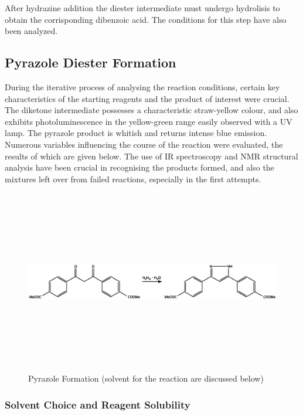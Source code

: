 \documentclass[../Master.tex]{subfiles}
\begin{document}
After hydrazine addition the diester intermediate must undergo hydrolisis to obtain the corrisponding dibenzoic acid. The conditions for this step have also been analyzed.

\subsection{Pyrazole Diester Formation}\label{sec:pyrazole-diester}

During the iterative process of analysing the reaction conditions, certain key characteristics of the starting reagents and the product of interest were crucial. The diketone intermediate possesses a characteristic straw-yellow colour, and also exhibits photoluminescence in the yellow-green range easily observed with a UV lamp. The pyrazole product is whitish and returns intense blue emission.\\
Numerous variables influencing the course of the reaction were evaluated, the results of which are given below. The use of IR spectroscopy and NMR structural analysis have been crucial in recognising the products formed, and also the mixtures left over from failed reactions, especially in the first attempts.

\begin{figure}[h!]
	\centering
	\includegraphics[width=13cm,height=8cm,keepaspectratio]{Structures/pyrazole-form.eps}
	\caption{Pyrazole Formation (solvent for the reaction are discussed below)}\label{fig:pyrazole-form}
\end{figure}

\subsubsection{Solvent Choice and Reagent Solubility}\label{sec:solvent}
\end{document}
